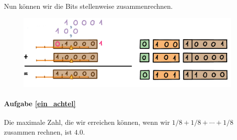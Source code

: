 \begin{enumerate}[(a)]
Nun können wir die Bits stellenweise zusammenrechnen.
\begin{figure}[H]
\centering
\includegraphics[width=\linewidth]{Pictures/Addition17-16and2_3.png}
\end{figure}

\end{enumerate}


\paragraph{Aufgabe \ref{ein_achtel}} Die maximale Zahl, die wir erreichen können, wenn wir \(1/8 + 1/8 + \dotsb + 1/8\) zusammen rechnen, ist \(4.0\).

